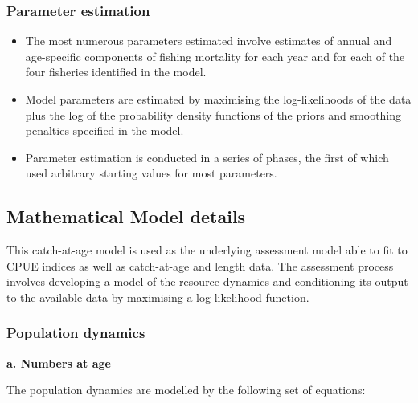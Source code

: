 \documentclass{article}
\begin{document}

\subsubsection{Parameter estimation}

\begin{itemize}

\item The most numerous parameters estimated involve estimates of annual and age-specific components of fishing mortality for each year and for each of the four fisheries identified in the model.

\item Model parameters are estimated by maximising the log-likelihoods of the data plus the log of the probability density functions of the priors and smoothing penalties specified in the model.

\item Parameter estimation is conducted in a series of phases, the first of which used arbitrary starting values for most parameters.

\end{itemize}

\subsection{Mathematical Model details}

This catch-at-age model is used as the underlying assessment model able to fit to CPUE indices as well as catch-at-age and length data. The assessment process involves developing a model of the resource dynamics and conditioning its output to the available data by maximising a log-likelihood function.

\subsubsection{Population dynamics}

\textbf{a. Numbers at age}

The population dynamics are modelled by the following set of equations:
\end{document}
